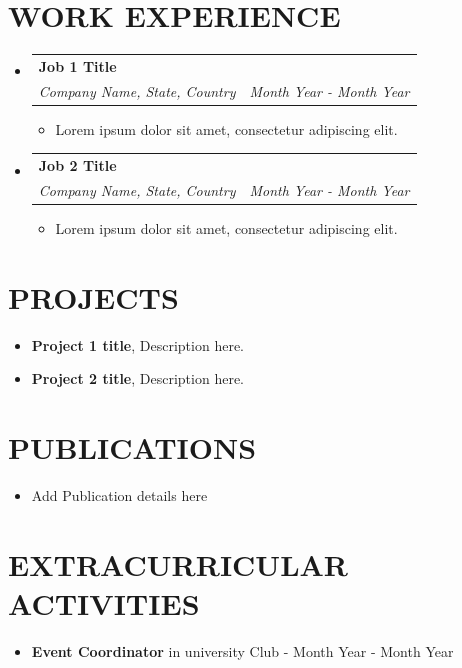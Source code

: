 \documentclass[letterpaper,11pt]{article}
\makeatletter
\newcommand{\resumeItem}[1]{
  \item\small{
    {#1 \vspace{-1pt}}
  }
}
\newcommand{\resumeSubheading}[4]{
  \vspace{-2pt}\item
    \begin{tabular*}{1.0\textwidth}[t]{l@{\extracolsep{\fill}}r}
      \textbf{\large#1} & \textbf{\small #2} \\
      \textit{\large#3} & \textit{\small #4} \\
      
    \end{tabular*}\vspace{-7pt}
}
\newcommand{\resumeSubHeadingListStart}{\begin{itemize}[leftmargin=0.0in, label={}]}
\newcommand{\resumeSubHeadingListEnd}{\end{itemize}}
\newcommand{\resumeItemListStart}{\begin{itemize}[leftmargin=0.1in]}
\newcommand{\resumeItemListEnd}{\end{itemize}\vspace{-5pt}}
\makeatother
\begin{document}
\section{\color{airforceblue}WORK EXPERIENCE}
  \resumeSubHeadingListStart

    \resumeSubheading
      {Job 1 Title}{} 
      {Company Name, State, Country}{Month Year - Month Year}
      \resumeItemListStart
            \resumeItem{\normalsize{Lorem ipsum dolor sit amet, consectetur adipiscing elit.}}
      \resumeItemListEnd  

    \resumeSubheading
      {Job 2 Title}{} 
      {Company Name, State, Country}{Month Year - Month Year}
      \resumeItemListStart
            \resumeItem{\normalsize{Lorem ipsum dolor sit amet, consectetur adipiscing elit.}}
      \resumeItemListEnd  

  \resumeSubHeadingListEnd
\vspace{-12pt}


\section{\color{airforceblue}PROJECTS}    
    \resumeItemListStart
        \vspace{0.5pt}
        \resumeItem{\normalsize{\textbf{Project 1 title}, Description here.}}
        \vspace{-5pt}
        
        \resumeItem{\normalsize{\textbf{Project 2 title}, Description here.}}
        \vspace{-5pt}
        
    \resumeItemListEnd  
   
 \vspace{-12pt}

\section{\color{airforceblue}PUBLICATIONS}
    
  \resumeItemListStart
    \resumeItem{\normalsize{Add Publication details here}}
    \vspace{-5pt}
    
  \resumeItemListEnd 
      
\vspace{-8pt}

\section{\color{airforceblue}EXTRACURRICULAR ACTIVITIES}
    
      \resumeItemListStart
        \resumeItem{\normalsize{\textbf{Event Coordinator} in university Club - {Month Year - Month Year} }} 
        \vspace{-5pt}
        
      \resumeItemListEnd 
      
\vspace{-12pt}
\end{document}
